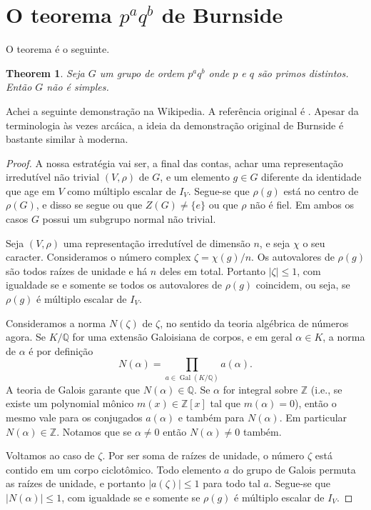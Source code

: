 \documentclass[12pt]{article}
\theoremstyle{plain}
\newtheorem{thm}{Theorem}[section]
\theoremstyle{definition}
\newcommand{\Q}{\mathbb{Q}}
\newcommand{\Z}{\mathbb{Z}}
\newcommand{\al}{\alpha}
\DeclareMathOperator{\Gal}{Gal}
\begin{document}
\section{O teorema $p^a q^b$ de Burnside}

O teorema é o seguinte.
\begin{thm}
Seja $G$ um grupo de ordem $p^a q^b$ onde $p$ e $q$ são primos distintos. Então $G$ não é simples.
\end{thm}

Achei a seguinte demonstração na Wikipedia. A referência original é {\cite[\S 240, Corollary III]{Burnside1911}}. Apesar da terminologia às vezes arcáica, a ideia da demonstração original de Burnside é bastante similar à moderna.

\begin{proof}
A nossa estratégia vai ser, a final das contas, achar uma representação irredutível não trivial $(V, \rho)$ de $G$, e um elemento $g \in G$ diferente da identidade que age em $V$ como múltiplo escalar de $I_V$. Segue-se que $\rho(g)$ está no centro de $\rho(G)$, e disso se segue ou que $Z(G) \neq \{e\}$ ou que $\rho$ não é fiel. Em ambos os casos $G$ possui um subgrupo normal não trivial.

Seja $(V, \rho)$ uma representação irredutível de dimensão $n$, e seja $\chi$ o seu caracter. Consideramos o número complex $\zeta = \chi(g) / n$. Os autovalores de $\rho(g)$ são todos raízes de unidade e há $n$ deles em total. Portanto $|\zeta| \leq 1$, com igualdade se e somente se todos os autovalores de $\rho(g)$ coincidem, ou seja, se $\rho(g)$ é múltiplo escalar de $I_V$.

Consideramos a norma $N(\zeta)$ de $\zeta$, no sentido da teoria algébrica de números agora. Se $K/\Q$ for uma extensão Galoisiana de corpos, e em geral $\al \in K$, a norma de $\al$ é por definição
\[
N(\al) = \prod_{a \in \Gal(K/\Q)} a(\al).
\]
A teoria de Galois garante que $N(\al) \in \Q$. Se $\al$ for integral sobre $\Z$ (i.e., se existe um polynomial mônico $m(x) \in \Z[x]$ tal que $m(\al) = 0$), então o mesmo vale para os conjugados $a(\al)$ e também para $N(\al)$. Em particular $N(\al) \in \Z$. Notamos que se $\al \neq 0$ então $N(\al) \neq 0$ também.

Voltamos ao caso de $\zeta$. Por ser soma de raízes de unidade, o número $\zeta$ está contido em um corpo ciclotômico. Todo elemento $a$ do grupo de Galois permuta as raízes de unidade, e portanto $|a(\zeta)| \leq 1$ para todo tal $a$. Segue-se que $|N(\al)| \leq 1$, com igualdade se e somente se $\rho(g)$ é múltiplo escalar de $I_V$.


\end{proof}
\end{document}
